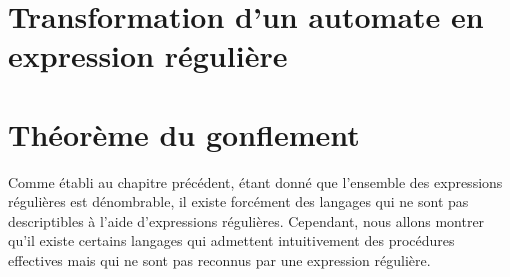 \section{Transformation d'un automate en expression régulière}

\section{Théorème du gonflement}

Comme établi au chapitre précédent, étant donné que l'ensemble des expressions régulières est dénombrable, il existe forcément des langages qui ne sont pas descriptibles à l'aide d'expressions régulières. Cependant, nous allons montrer qu'il existe certains langages qui admettent intuitivement des procédures effectives mais qui ne sont pas reconnus par une expression régulière.
